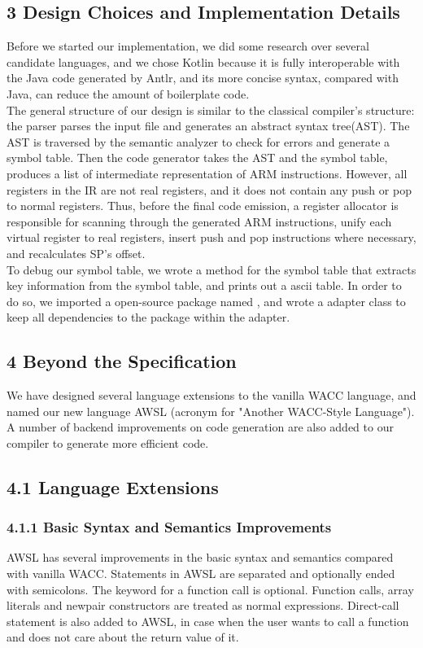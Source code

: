 \documentclass[10pt,a4paper]{report}
\begin{document}
  \subsection*{3 Design Choices and Implementation Details}
  Before we started our implementation, we did some research over several candidate languages, and we chose Kotlin because it is
  fully interoperable with the Java code generated by Antlr, and its more concise syntax, compared with Java, can reduce the amount 
  of boilerplate code.\\
  The general structure of our design is similar to the classical compiler's structure: the parser parses the input file and generates
  an abstract syntax tree(AST). The AST is traversed by the semantic analyzer to check for errors and generate a symbol table.
  Then the code generator takes the AST and the symbol table, produces a list of intermediate representation of ARM instructions.
  However, all registers in the IR are not real registers, and it does not contain any push or pop to normal registers. Thus, before the
  final code emission, a register allocator is responsible for scanning through the generated ARM instructions, unify each virtual 
  register to real registers, insert push and pop instructions where necessary, and recalculates SP's offset.\\
  To debug our symbol table, we wrote a  method for the symbol table that extracts key information from the symbol table, 
  and prints out a ascii table. In order to do so, we imported a open-source package named , and wrote a adapter class 
   to keep all dependencies to the package within the adapter.

  \subsection*{4 Beyond the Specification}
  We have designed several language extensions to the vanilla WACC language, and named our new language AWSL (acronym for "Another WACC-Style Language").
  A number of backend improvements on code generation are also added to our compiler to generate more efficient code.
  \subsection*{4.1 Language Extensions}

  \subsubsection*{4.1.1 Basic Syntax and Semantics Improvements}
  AWSL has several improvements in the basic syntax and semantics compared with vanilla WACC. Statements in AWSL are separated and optionally
  ended with semicolons. The  keyword for a function call is optional. Function calls, array literals and newpair constructors 
  are treated as normal expressions. Direct-call statement is also added to AWSL, in case when the user wants to call a function and does not
  care about the return value of it.
\end{document}
